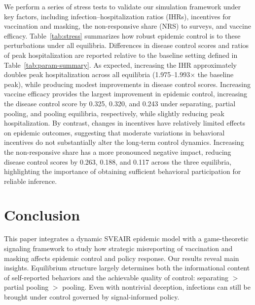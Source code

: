 \documentclass[sigconf,review]{acmart}
\begin{document}
We perform a series of stress tests to validate our simulation framework under key factors, including infection–hospitalization ratios (IHRs), incentives for vaccination and masking, the non-responsive share (NRS) to surveys, and vaccine efficacy. Table~\ref{tab:stress} summarizes how robust epidemic control is to these perturbations under all equilibria. Differences in disease control scores and ratios of peak hospitalization are reported relative to the baseline setting defined in Table~\ref{tab:param-summary}. As expected, increasing the IHR approximately doubles peak hospitalization across all equilibria (1.975--1.993$\times$ the baseline peak), while producing modest improvements in disease control scores. Increasing vaccine efficacy provides the largest improvement in epidemic control, increasing the disease control score by 0.325, 0.320, and 0.243 under separating, partial pooling, and pooling equilibria, respectively, while slightly reducing peak hospitalization. By contrast, changes in incentives have relatively limited effects on epidemic outcomes, suggesting that moderate variations in behavioral incentives do not substantially alter the long-term control dynamics. Increasing the non-responsive share has a more pronounced negative impact, reducing disease control scores by 0.263, 0.188, and 0.117 across the three equilibria, highlighting the importance of obtaining sufficient behavioral participation for reliable inference. %


\section{Conclusion}
This paper integrates a dynamic SVEAIR epidemic model with a game-theoretic signaling framework to study how strategic misreporting of vaccination and masking affects epidemic control and policy response. %
Our results reveal main insights. Equilibrium structure largely determines both the informational content of self-reported behaviors and the achievable quality of control: separating $>$ partial pooling $>$ pooling. %
Even with nontrivial deception, infections can still be brought under control governed by signal-informed policy. %
\end{document}
